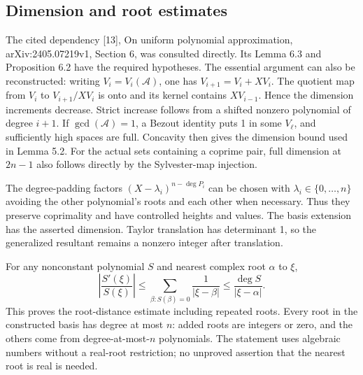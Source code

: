 \documentclass[10pt]{article}
\begin{document}
\subsection*{Dimension and root estimates}
The cited dependency [13], On uniform polynomial approximation, arXiv:2405.07219v1, Section 6, was consulted directly. Its Lemma 6.3 and Proposition 6.2 have the required hypotheses. The essential argument can also be reconstructed: writing \(V_i=V_i(\mathcal A)\), one has \(V_{i+1}=V_i+XV_i\). The quotient map from \(V_i\) to \(V_{i+1}/XV_i\) is onto and its kernel contains \(XV_{i-1}\). Hence the dimension increments decrease. Strict increase follows from a shifted nonzero polynomial of degree \(i+1\). If \(\gcd(\mathcal A)=1\), a Bezout identity puts 1 in some \(V_\ell\), and sufficiently high spaces are full. Concavity then gives the dimension bound used in Lemma 5.2. For the actual sets containing a coprime pair, full dimension at \(2n-1\) also follows directly by the Sylvester-map injection.\par
The degree-padding factors \((X-\lambda_i)^{n-\deg P_i}\) can be chosen with \(\lambda_i\in\{0,\ldots,n\}\) avoiding the other polynomial’s roots and each other when necessary. Thus they preserve coprimality and have controlled heights and values. The basis extension has the asserted dimension. Taylor translation has determinant 1, so the generalized resultant remains a nonzero integer after translation.\par
For any nonconstant polynomial \(S\) and nearest complex root \(\alpha\) to \(\xi\), \[\left|\frac{S'(\xi)}{S(\xi)}\right|
 \le \sum_{\beta:S(\beta)=0}\frac1{|\xi-\beta|}
 \le \frac{\deg S}{|\xi-\alpha|}.\] This proves the root-distance estimate including repeated roots. Every root in the constructed basis has degree at most \(n\): added roots are integers or zero, and the others come from degree-at-most-\(n\) polynomials. The statement uses algebraic numbers without a real-root restriction; no unproved assertion that the nearest root is real is needed.\par
\end{document}
